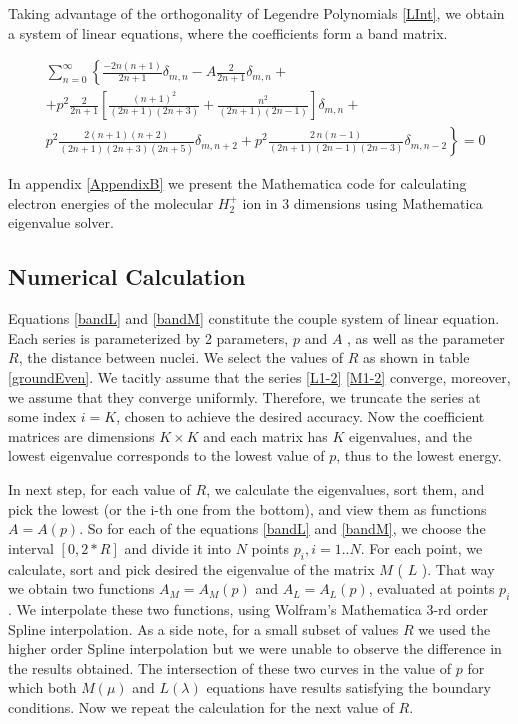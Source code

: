 Taking advantage of the orthogonality of Legendre Polynomials \eqref{LInt}, we obtain a system of linear equations, where the coefficients form a band matrix.

\begin{equation}\label{bandM}
\begin{split}
& \sum_{n=0}^{\infty}\left\{\frac{-2n(n+1)}{2n+1}\delta_{m,n} - A\frac{2}{2n+1}\delta_{m,n} + \right.\\[.8em]
& \left. + p^2\frac{2}{2n+1} \left[ \frac{(n+1)^2}{(2n+1)(2n+3)} + \frac{n^2}{(2n+1)(2n-1)}\right]\delta_{m,n} + \right. \\[.8em] 
& \left.p^2\frac{2(n+1)(n+2)}{(2n+1)(2n+3)(2n+5)}\delta_{m,n+2} +p^2 \frac{2\,n(n-1)}{(2n+1)(2n-1)(2n-3)}\delta_{m,n-2} \right\} = 0
\end{split}
\end{equation}

In appendix \ref{AppendixB} we present the Mathematica code for calculating electron energies of the molecular $ H_2^{+} $ ion in 3 dimensions using Mathematica eigenvalue solver.

\subsection{Numerical Calculation}

Equations \eqref{bandL} and \eqref{bandM} constitute the couple system of linear equation. Each series is parameterized by 2 parameters, $ p $ and $ A $ , as well as the parameter $ R $, the distance between nuclei. We select the values of $ R $ as shown in table \ref{groundEven}. We tacitly assume that the series \eqref{L1-2} \eqref{M1-2} converge, moreover, we assume that they converge uniformly. Therefore, we truncate the series at some index $ i = K $, chosen to achieve the desired accuracy. Now the coefficient matrices are dimensions $ K \times K $ and each matrix has $ K $ eigenvalues, and the lowest eigenvalue corresponds to the lowest value of $ p $, thus to the lowest energy. 

 In next step, for each value of $ R $, we calculate the eigenvalues, sort them, and pick the lowest (or the i-th one from the bottom), and view them as functions $ A = A(p) $. So for each of the equations \eqref{bandL} and \eqref{bandM}, we choose the interval $\left[0, 2 * R \right] $ and divide it into $ N $ points $ p_{i}, i = 1..N $. For each point, we calculate, sort and pick desired the eigenvalue of the matrix $ M $ ( $ L $ ). That way we obtain two  functions $ A_{M} = A_{M}(p) $ and $ A_{L} = A_{L}(p) $, evaluated at points $ p_i $. We interpolate these two functions, using Wolfram's Mathematica 3-rd order Spline interpolation. 
As a side note, for a small subset of values $ R $ we used the higher order Spline interpolation but we were unable to observe the difference in the results obtained.
 The intersection of these two curves in the value of $ p $ for which both $ M(\mu) $ and $ L(\lambda) $ equations have results satisfying the boundary conditions. Now we repeat the calculation for the next value of $ R $.

